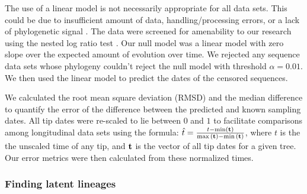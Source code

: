\documentclass[12pt]{article}
\begin{document}
The use of a linear model is not necessarily appropriate for all data sets.
This could be due to insufficient amount of data, handling/processing errors, or a lack of phylogenetic signal \citep{Tempest}.
The data were screened for amenability to our research using the nested log ratio test \citep{Ho14}. 
Our null model was a linear model with zero slope over the expected amount of evolution over time.
We rejected any sequence data sets whose phylogeny couldn't reject the null model with threshold $\alpha=0.01$.
We then used the linear model to predict the dates of the censored sequences.

We calculated the root mean square deviation (RMSD) and the median difference to quantify the error of the difference between the predicted and known sampling dates.
All tip dates were re-scaled to lie between $0$ and $1$ to facilitate comparisons among longitudinal data sets using the formula: $\hat{t} = \frac{t - \min(\bf{t}) }{ \max{(\bf{t})} - \min{(\bf{t}})}$, where $t$ is the the unscaled time of any tip, and $\bf{t}$ is the vector of all tip dates for a given tree. 
Our error metrics were then calculated from these normalized times.%

\subsubsection * {Finding latent lineages} \label{subsec:experiments}
\end{document}
